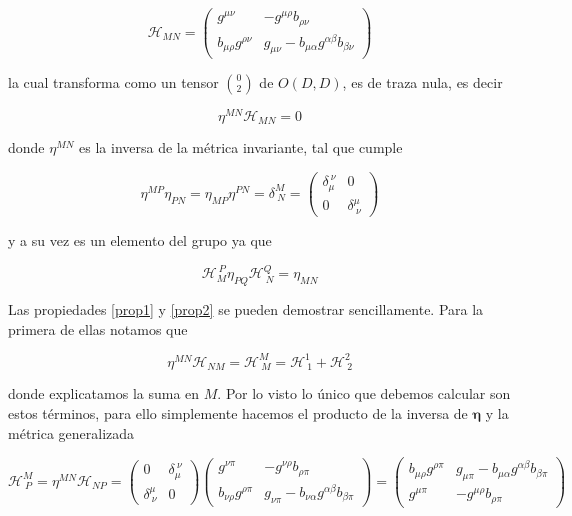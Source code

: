 \documentclass{article}
\numberwithin{equation}{section}
\begin{document}
\begin{equation}\label{key}
\mathcal{H}_{MN}=
\begin{pmatrix}
g^{\mu\nu} & -g^{\mu\rho}b_{\rho\nu}\\
b_{\mu\rho}g^{\rho\nu} & g_{\mu\nu} -b_{\mu\alpha}g^{\alpha\beta}b_{\beta\nu} 
\end{pmatrix}
\end{equation}

la cual transforma como un tensor $ \binom{0}{2} $ de $ O(D,D) $, es de traza nula, es decir

\begin{equation}\label{prop1}
\eta^{MN}\mathcal{H}_{MN}=0
\end{equation}

donde $ \eta^{MN} $ es la inversa de la métrica invariante, tal que cumple

\begin{equation}\label{key}
\eta^{MP} \eta_{PN} = \eta_{MP} \eta^{PN} = \delta^M_{\ N} = 
\begin{pmatrix}
\delta_{\mu}^{ \ \nu} & 0 \\
0 & \delta^{\mu}_{ \ \nu} 
\end{pmatrix}
\end{equation}

y a su vez es un elemento del grupo ya que

\begin{equation}\label{prop2}
\mathcal{H}_M^{\ P}\eta_{PQ}\mathcal{H}^Q_{\ N} = \eta_{MN}
\end{equation}


Las propiedades \ref{prop1} y \ref{prop2} se pueden demostrar sencillamente. Para la primera de ellas notamos que

\begin{equation}\label{key}
\eta^{MN}\mathcal{H}_{NM} = \mathcal{H}^M_{\ M} = \mathcal{H}^1_{\ 1} + \mathcal{H}^2_{\ 2}
\end{equation}

donde explicatamos la suma en $ M $. Por lo visto lo único que debemos calcular son estos términos, para ello simplemente hacemos el producto de la inversa de $ \pmb{\eta} $ y la métrica generalizada

\begin{equation}\label{Hcruzado}
\mathcal{H}^M_{\ P} = \eta^{MN}\mathcal{H}_{NP} = \begin{pmatrix}
0 & \delta_{\mu}^{ \ \nu} \\
\delta^{\mu}_{ \ \nu} & 0 
\end{pmatrix}  
\begin{pmatrix}
g^{\nu\pi} & -g^{\nu\rho}b_{\rho\pi}\\
b_{\nu\rho}g^{\rho\pi} & g_{\nu\pi} -b_{\nu\alpha}g^{\alpha\beta}b_{\beta\pi}
\end{pmatrix} =  
\begin{pmatrix}
b_{\mu\rho}g^{\rho\pi} & g_{\mu\pi} -b_{\mu\alpha}g^{\alpha\beta}b_{\beta\pi}\\
g^{\mu\pi} & -g^{\mu\rho}b_{\rho\pi}
\end{pmatrix}
\end{equation}
\end{document}
